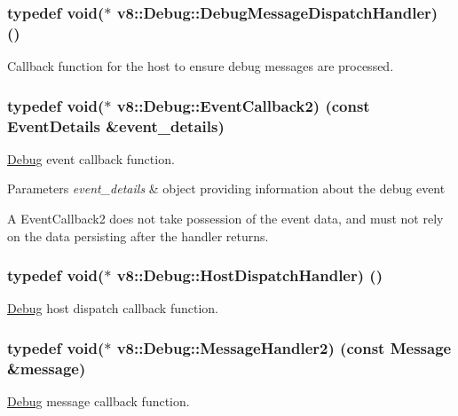 \subsubsection[{Debug\+Message\+Dispatch\+Handler}]{\setlength{\rightskip}{0pt plus 5cm}typedef void($\ast$ v8\+::\+Debug\+::\+Debug\+Message\+Dispatch\+Handler) ()}\label{classv8_1_1_debug_a91cd8aa9743e3478bc63fe73abcd557c}
Callback function for the host to ensure debug messages are processed. \hypertarget{classv8_1_1_debug_aae787219311eeedcbbe2c63cf36d1e53}{}
\subsubsection[{Event\+Callback2}]{\setlength{\rightskip}{0pt plus 5cm}typedef void($\ast$ v8\+::\+Debug\+::\+Event\+Callback2) (const {\bf Event\+Details} \&event\+\_\+details)}\label{classv8_1_1_debug_aae787219311eeedcbbe2c63cf36d1e53}
\hyperlink{classv8_1_1_debug}{Debug} event callback function.


\begin{DoxyParams}{Parameters}
{\em event\+\_\+details} & object providing information about the debug event\\
\hline
\end{DoxyParams}
A Event\+Callback2 does not take possession of the event data, and must not rely on the data persisting after the handler returns. \hypertarget{classv8_1_1_debug_a442f686afe7d80928b57b3ff8ac3f6e7}{}
\subsubsection[{Host\+Dispatch\+Handler}]{\setlength{\rightskip}{0pt plus 5cm}typedef void($\ast$ v8\+::\+Debug\+::\+Host\+Dispatch\+Handler) ()}\label{classv8_1_1_debug_a442f686afe7d80928b57b3ff8ac3f6e7}
\hyperlink{classv8_1_1_debug}{Debug} host dispatch callback function. \hypertarget{classv8_1_1_debug_a0fb8f7e1f8fa47cb23f7ad72cd533c77}{}
\subsubsection[{Message\+Handler2}]{\setlength{\rightskip}{0pt plus 5cm}typedef void($\ast$ v8\+::\+Debug\+::\+Message\+Handler2) (const {\bf Message} \&message)}\label{classv8_1_1_debug_a0fb8f7e1f8fa47cb23f7ad72cd533c77}
\hyperlink{classv8_1_1_debug}{Debug} message callback function.


